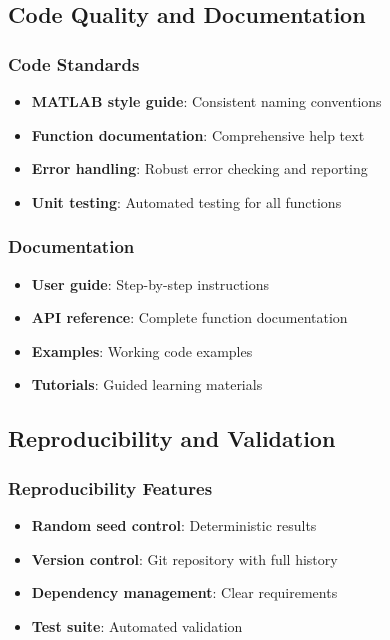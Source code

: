 \subsection{Code Quality and Documentation}

\subsubsection{Code Standards}
\begin{itemize}
    \item \textbf{MATLAB style guide}: Consistent naming conventions
    \item \textbf{Function documentation}: Comprehensive help text
    \item \textbf{Error handling}: Robust error checking and reporting
    \item \textbf{Unit testing}: Automated testing for all functions
\end{itemize}

\subsubsection{Documentation}
\begin{itemize}
    \item \textbf{User guide}: Step-by-step instructions
    \item \textbf{API reference}: Complete function documentation
    \item \textbf{Examples}: Working code examples
    \item \textbf{Tutorials}: Guided learning materials
\end{itemize}

\subsection{Reproducibility and Validation}

\subsubsection{Reproducibility Features}
\begin{itemize}
    \item \textbf{Random seed control}: Deterministic results
    \item \textbf{Version control}: Git repository with full history
    \item \textbf{Dependency management}: Clear requirements
    \item \textbf{Test suite}: Automated validation
\end{itemize}

